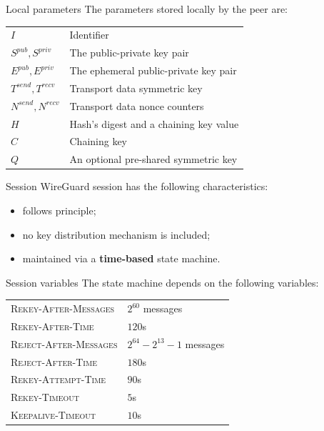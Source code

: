\documentclass[light]{presenta}
\begin{document}
\begin{frame}{Local parameters}
  The parameters stored locally by the peer are:
  \begin{table}[H]
    \centering
    \begin{tabularx}{0.9\textwidth}{lX}
      $I$ & Identifier\\
      $S^{pub}, S^{priv}$ & The public-private key pair\\
      $E^{pub}, E^{priv}$ & The ephemeral public-private key pair\\
      $T^{send}, T^{recv}$ & Transport data symmetric key\\
      $N^{send}, N^{recv}$ & Transport data nonce counters\\
      $H$ & Hash's digest and a chaining key value\\
      $C$ & Chaining key\\
      $Q$ & An optional pre-shared symmetric key
    \end{tabularx}
  \end{table}
\end{frame}

\begin{frame}{Session}
  WireGuard session has the following characteristics:
  \begin{itemize}
    \item follows  principle;
    \pause
    \item no key distribution mechanism is included; %
    \pause
    \item maintained via a \textbf{time-based} state machine.
  \end{itemize}
\end{frame}

\begin{frame}{Session variables}
  The state machine depends on the following variables:
  \begin{table}[H]
    \centering
    \begin{tabularx}{0.9\textwidth}{lX}
      \textsc{Rekey-After-Messages} & $2^{60}$ messages\\
      \textsc{Rekey-After-Time} & $120$s\\
      \textsc{Reject-After-Messages} & $2^{64} - 2^{13} - 1$ messages\\
      \textsc{Reject-After-Time} & $180$s\\
      \textsc{Rekey-Attempt-Time} & $90$s\\
      \textsc{Rekey-Timeout} & $5$s\\
      \textsc{Keepalive-Timeout} & $10$s
    \end{tabularx}
  \end{table}
\end{frame}
\end{document}
